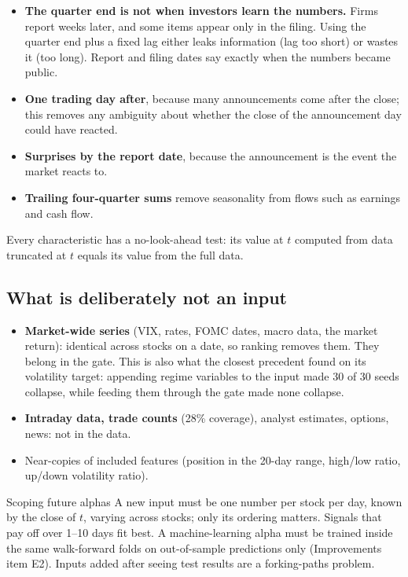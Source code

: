 \begin{whybox}
\begin{itemize}
\item \textbf{The quarter end is not when investors learn the numbers.} Firms report weeks later, and some items
  appear only in the filing. Using the quarter end plus a fixed lag either leaks information (lag too short)
  or wastes it (too long). Report and filing dates say exactly when the numbers became public.
\item \textbf{One trading day after}, because many announcements come after the close; this removes any
  ambiguity about whether the close of the announcement day could have reacted.
\item \textbf{Surprises by the report date}, because the announcement is the event the market reacts to.
\item \textbf{Trailing four-quarter sums} remove seasonality from flows such as earnings and cash flow.
\end{itemize}
\end{whybox}

Every characteristic has a no-look-ahead test: its value at $t$ computed from data truncated at $t$ equals
its value from the full data.

\subsection{What is deliberately not an input}

\begin{itemize}
\item \textbf{Market-wide series} (VIX, rates, FOMC dates, macro data, the market return): identical across
  stocks on a date, so ranking removes them. They belong in the gate. This is also what the closest
  precedent found on its volatility target: appending regime variables to the input made 30 of 30 seeds
  collapse, while feeding them through the gate made none collapse.
\item \textbf{Intraday data, trade counts} (28\% coverage), analyst estimates, options, news: not in the data.
\item Near-copies of included features (position in the 20-day range, high/low ratio, up/down volatility
  ratio).
\end{itemize}

\begin{keybox}{Scoping future alphas}
A new input must be one number per stock per day, known by the close of $t$, varying across stocks; only
its ordering matters. Signals that pay off over 1--10 days fit best. A machine-learning alpha must be
trained inside the same walk-forward folds on out-of-sample predictions only (Improvements item E2).
Inputs added after seeing test results are a forking-paths problem.
\end{keybox}
